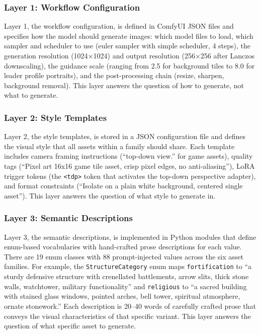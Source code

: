 \documentclass[conference]{IEEEtran}
\begin{document}

\subsubsection{Layer 1: Workflow Configuration}

Layer 1, the workflow configuration, is defined in ComfyUI JSON files and specifies how the model should generate images: which model files to load, which sampler and scheduler to use (euler sampler with simple scheduler, 4 steps), the generation resolution (1024$\times$1024) and output resolution (256$\times$256 after Lanczos downscaling), the guidance scale (ranging from 2.5 for background tiles to 8.0 for leader profile portraits), and the post-processing chain (resize, sharpen, background removal). This layer answers the question of how to generate, not what to generate.

\subsubsection{Layer 2: Style Templates}

Layer 2, the style templates, is stored in a JSON configuration file and defines the visual style that all assets within a family should share. Each template includes camera framing instructions (``top-down view.'' for game assets), quality tags (``Pixel art 16x16 game tile asset, crisp pixel edges, no anti-aliasing''), LoRA trigger tokens (the \texttt{<tdp>} token that activates the top-down perspective adapter), and format constraints (``Isolate on a plain white background, centered single asset''). This layer answers the question of what style to generate in.

\subsubsection{Layer 3: Semantic Descriptions}

Layer 3, the semantic descriptions, is implemented in Python modules that define enum-based vocabularies with hand-crafted prose descriptions for each value. There are 19 enum classes with 88 prompt-injected values across the six asset families. For example, the \texttt{StructureCategory} enum maps \texttt{fortification} to ``a sturdy defensive structure with crenellated battlements, arrow slits, thick stone walls, watchtower, military functionality'' and \texttt{religious} to ``a sacred building with stained glass windows, pointed arches, bell tower, spiritual atmosphere, ornate stonework.'' Each description is 20--40 words of carefully crafted prose that conveys the visual characteristics of that specific variant. This layer answers the question of what specific asset to generate.
\end{document}
